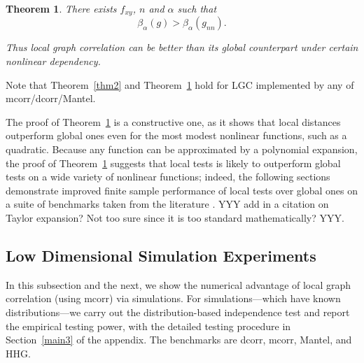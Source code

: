 \documentclass[11pt]{article}
\newtheorem{thm}{Theorem}
\begin{document}
\begin{thm}
\label{thm3}
There exists $f_{xy}$, $n$ and $\alpha$ such that 
\begin{equation}
\beta_{\alpha}(g) > \beta_{\alpha}(g_{nn}).
\end{equation}

Thus local graph correlation can be better than its global counterpart under certain nonlinear dependency.
\end{thm}
Note that Theorem~\ref{thm2} and Theorem~\ref{thm3} hold for LGC implemented by any of mcorr/dcorr/Mantel.

The proof of Theorem~\ref{thm3} is a constructive one, as it shows that local distances outperform global ones even for the most modest nonlinear functions, such as a quadratic.  Because any function can be approximated by a polynomial expansion, the proof of Theorem~\ref{thm3} suggests that local tests is likely to outperform global tests on a wide variety of nonlinear functions; indeed, the following sections demonstrate improved finite sample performance of local tests over global ones on a suite of benchmarks taken from the literature \cite{SzekelyRizzoBakirov2007, SimonTibshirani2012, GorfineHellerHeller2012, HellerGorfine2013}.
YYY add in a citation on Taylor expansion? Not too sure since it is too standard mathematically? YYY.



\subsection{Low Dimensional Simulation Experiments}
\label{numer1}
In this subsection and the next, we show the numerical advantage of local graph correlation (using mcorr) via simulations. For simulations---which have known distributions---we carry out the distribution-based independence test and report the empirical testing power, with the detailed testing procedure in Section~\ref{main3} of the appendix. The benchmarks are dcorr, mcorr, Mantel, and HHG.

\end{document}
